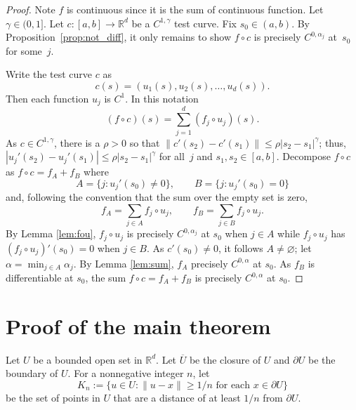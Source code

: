 \documentclass[12pt]{amsart}
\newcommand{\adj}{{precisely }} %
\numberwithin{equation}{section}
\newcommand{\R}{{\mathbb R}}		%
\newcommand{\cn}{\colon}                %
\theoremstyle{definition}
\theoremstyle{remark}
\newcommand{\f}{\partial}
\begin{document}
\begin{proof}
  Note $f$ is continuous since it is the sum of  continuous function.
  Let $\gamma\in(0,1]$.
    Let $c \cn [a,b]\to \R^d$ be a $C^{1,\gamma}$ test curve. 
   Fix $s_0\in (a,b)$.
   By Proposition~\ref{prop:not_diff},
    it  only remains  to show 
    $f\circ c$ is \adj $C^{0,\alpha_j}$ at~$s_0$  for some~$j$.

    
    Write the test curve $c$ as 
    $$
    c(s) = ( u_1(s), u_2(s) ,\ldots,u_d(s)).
    $$
    Then each function $u_j$ is $C^1$.  In this notation
    $$
    (f\circ c) (s) = \sum_{j=1}^d (f_j\circ u_j)(s).
    $$
    As $c\in C^{1,\gamma}$, there is a 
    $\rho>0$ so that $\| c'(s_2) - c'(s_1)\| \le \rho |s_2 - s_1|^\gamma$;
    thus, $|u_j'(s_2) - u_j'(s_1)| \le \rho |s_2- s_1|^\gamma$ 
    for all~$j$ and $s_1, s_2\in [a,b]$. 
    Decompose $f\circ c$ as $f\circ  c =f_A + f_B$ where
    \begin{equation*}
        A = \{ j : u_j'(s_0) \ne 0\}, \qquad 
        B= \{ j : u_j'(s_0) = 0\}
    \end{equation*}
    and, following the convention that the sum over the empty set is zero, 
    \begin{equation*}
    f_A = \sum_{j\in A} f_j\circ u_j, \qquad f_B = \sum_{j\in B} f_j\circ u_j.
    \end{equation*}
    By Lemma \ref{lem:fou},   
    $f_j \circ u_j$ is \adj $C^{0,\alpha_j}$ at $s_0$ when $j\in A$
    while $f_j\circ u_j$ has $(f_j\circ u_j)'(s_0)=0$ when $j \in B$.
    As $c'(s_0)\ne 0$, it follows $A\ne \varnothing$;
    let $\alpha = \min_{j\in A}\alpha_j$.
    By Lemma \ref{lem:sum}, 
    $f_A$ \adj  $C^{0,\alpha}$ at $s_0$. 
    As $f_B$ is differentiable at $s_0$,
    the sum $f\circ c=f_A + f_B$ is \adj $C^{0,\alpha}$ at $s_0$.
\end{proof}
                          

\section{Proof of the main theorem}\label{section:PfMainThm} 

Let $U$ be a bounded open set in $\R^d$. Let $\overline U$ be
the closure of $U$ and $\f U$ be the boundary of $U$.
For a nonnegative integer $n$,  let
\begin{equation*}
K_n := \{ u\in U: \| u-x\| \ge 1/n \text{ for each  $x\in \f U$}\}
\end{equation*}
be the set of
points in $U$ that are  a distance of at least $1/n$
from $\f U$.
\end{document}
